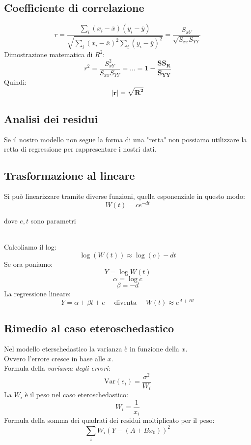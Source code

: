 \documentclass[]{article}
\begin{document}
    \subsection{Coefficiente di correlazione}
    \[ r = \frac{\sum_i (x_i - \overline x)(y_i - \overline y)}{\sqrt{\sum_i (x_i - \overline x)^2 \sum_i(y_i - \overline y)^2}} = \frac{S_{xY}}{\sqrt{S_{xx}S_{YY}}} \]
    Dimostrazione matematica di $R^2$:
    \[ r^2 = \frac{S_{xY}^2}{S_{xx}S_{YY}} = \ldots = \boldsymbol{1- \frac{SS_R}{S_{YY}}} \]
    Quindi:
    \[ \boldsymbol{|r| = \sqrt{R^2}} \]
    \subsection{Analisi dei residui}
    Se il nostro modello non segue la forma di una "retta" non possiamo utilizzare la retta di regressione per rappresentare i nostri dati.
    \subsection{Trasformazione al lineare}
    Si può linearizzare tramite diverse funzioni, quella esponenziale in questo modo:
    \[ W(t) = ce^{-dt}\]
    \centerline{dove $e, t$ sono parametri} \\[2ex]
    Calcoliamo il log:
    \[ \log({W}(t)) \approx \log{(c)}-dt \]
    Se ora poniamo:
    \[ Y = \log{W(t)} \]
    \[ \alpha = \log{c} \]
    \[ \beta = -d \]
    La regressione lineare:
    \[ Y = \alpha + \beta t + e \quad \text{ diventa } \quad W(t) \approx e^{A+Bt} \]
    \subsection{Rimedio al caso eteroschedastico}
    Nel modello eterschedastico la varianza è in funzione della $x$. \\
    Ovvero l'errore cresce in base alle $x$. \\[2ex]
    Formula della \textit{varianza degli errori}:
    \[ \text{Var}(e_i)=\frac{\sigma^2}{W_i} \]
    La $W_i$ è il peso nel caso eteroschedastico:
    \[ W_i=\frac{1}{x_i} \]
    Formula della somma dei quadrati dei residui moltiplicato per il peso:
    \[ \sum_iW_i(Y-(A+Bx_0))^2 \]
\end{document}
